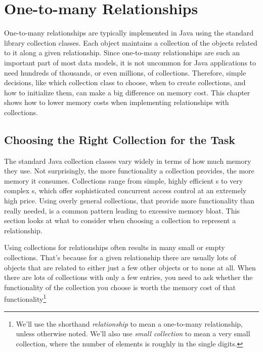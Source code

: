 \chapter{One-to-many Relationships}
\label{chapter:representing-relationships}

One-to-many relationships
are typically implemented in Java using the standard library collection classes.
Each object maintains a collection of the objects related to
it along a given relationship. Since one-to-many relationships are such an
important part of most data models, it is not uncommon for Java applications to
need hundreds of thousands, or even millions, of collections.
Therefore, simple decisions, like which collection class to choose,
when to create collections, and how to initialize them,
can make a big difference on memory cost.
This chapter shows how to lower memory costs when implementing
relationships with collections.
 
 \section{Choosing the Right Collection for the Task}
 \label{sec:choosing-collection}

The standard Java collection classes vary widely in terms of how much memory they use.
Not surprisingly, the more functionality a collection provides, the more
memory it consumes. Collections range from simple, highly efficient
s to very complex
s, which offer sophisticated concurrent access
control at an extremely high price. 
Using overly general collections, that provide more functionality than
really needed, is a common pattern leading to excessive memory bloat.
This section looks at what to consider when choosing a collection to
represent a relationship. 

Using collections for relationships often results in many small or
empty collections.  That's because for a given relationship there are
usually lots of objects that are related to either just a few other
objects or to none at all.
When there are lots of collections with only a few entries, you need to ask  whether
the functionality of the collection you choose is worth the memory cost of that
functionality\footnote{We'll use the shorthand
\emph{relationship} to mean a one-to-many relationship, unless otherwise noted. 
We'll also use \emph{small collection} to mean a very small collection, where
the number of elements is roughly in the single digits.}

